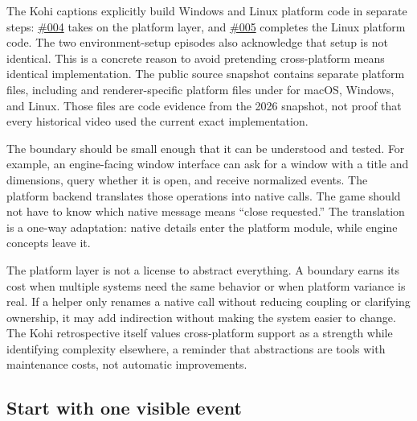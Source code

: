 The Kohi captions explicitly build Windows and Linux platform code in separate steps: \href{https://www.youtube.com/watch?v=ojEPsZFPj2Q}{\#004} takes on the platform layer, and \href{https://www.youtube.com/watch?v=nGgvWzoCsyk}{\#005} completes the Linux platform code. The two environment-setup episodes also acknowledge that setup is not identical. This is a concrete reason to avoid pretending cross-platform means identical implementation. The public source snapshot contains separate platform files, including  and renderer-specific platform files under  for macOS, Windows, and Linux. Those files are code evidence from the 2026 snapshot, not proof that every historical video used the current exact implementation.

The boundary should be small enough that it can be understood and tested. For example, an engine-facing window interface can ask for a window with a title and dimensions, query whether it is open, and receive normalized events. The platform backend translates those operations into native calls. The game should not have to know which native message means ``close requested.'' The translation is a one-way adaptation: native details enter the platform module, while engine concepts leave it.

The platform layer is not a license to abstract everything. A boundary earns its cost when multiple systems need the same behavior or when platform variance is real. If a helper only renames a native call without reducing coupling or clarifying ownership, it may add indirection without making the system easier to change. The Kohi retrospective itself values cross-platform support as a strength while identifying complexity elsewhere, a reminder that abstractions are tools with maintenance costs, not automatic improvements.

\subsection{Start with one visible event}\label{05-engine-i-ch013-start-with-one-visible-event}

\hypertarget{05-engine-i-ch013-start-with-one-visible-event}{}

